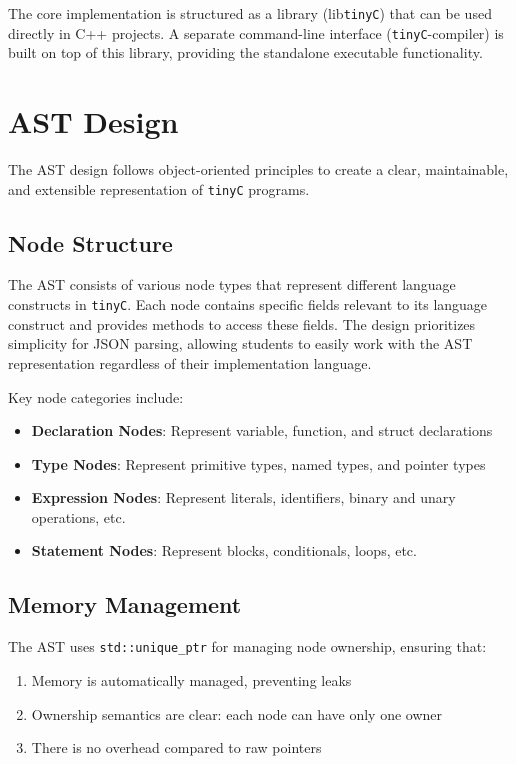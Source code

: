 The core implementation is structured as a library (lib\texttt{tinyC}) that can be used directly in C++ projects. A separate command-line interface (\texttt{tinyC}-compiler) is built on top of this library, providing the standalone executable functionality.

\section{AST Design}

The AST design follows object-oriented principles to create a clear, maintainable, and extensible representation of \texttt{tinyC} programs.

\subsection{Node Structure}

The AST consists of various node types that represent different language constructs in \texttt{tinyC}. Each node contains specific fields relevant to its language construct and provides methods to access these fields. The design prioritizes simplicity for JSON parsing, allowing students to easily work with the AST representation regardless of their implementation language.

Key node categories include:

\begin{itemize}
    \item \textbf{Declaration Nodes}: Represent variable, function, and struct declarations
    \item \textbf{Type Nodes}: Represent primitive types, named types, and pointer types
    \item \textbf{Expression Nodes}: Represent literals, identifiers, binary and unary operations, etc.
    \item \textbf{Statement Nodes}: Represent blocks, conditionals, loops, etc.
\end{itemize}

\subsection{Memory Management}

The AST uses \texttt{std::unique\_ptr} for managing node ownership, ensuring that:
\begin{enumerate}
    \item Memory is automatically managed, preventing leaks
    \item Ownership semantics are clear: each node can have only one owner
    \item There is no overhead compared to raw pointers
\end{enumerate}

